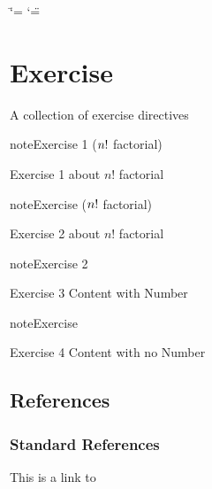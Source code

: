 

\ifdefined\shorthandoff
  \ifnum\catcode`\=\string=\active\shorthandoff{=}\fi
  \ifnum\catcode`\"=\active{}\fi
\fi

\pagestyle{empty}
\sphinxmaketitle
\pagestyle{plain}
\sphinxtableofcontents
\pagestyle{normal}
\label{\detokenize{index::doc}}


\sphinxstepscope


\chapter{Exercise}
\label{\detokenize{exercise:exercise}}\label{\detokenize{exercise::doc}}
\sphinxAtStartPar
A collection of exercise directives
 \label{exercise:exercise-1}

\begin{sphinxadmonition}{note}{Exercise 1 (\protect\(n!\protect\) factorial)}



\sphinxAtStartPar
Exercise 1 about \(n!\) factorial
\end{sphinxadmonition}
 \label{exercise:exercise-2}
\begin{sphinxadmonition}{note}{Exercise (\protect\(n!\protect\) factorial)}



\sphinxAtStartPar
Exercise 2 about \(n!\) factorial
\end{sphinxadmonition}
 \label{exercise:exercise-3}

\begin{sphinxadmonition}{note}{Exercise 2}



\sphinxAtStartPar
Exercise 3 Content with Number
\end{sphinxadmonition}
 \label{exercise:exercise-4}
\begin{sphinxadmonition}{note}{Exercise}



\sphinxAtStartPar
Exercise 4 Content with no Number
\end{sphinxadmonition}


\section{References}
\label{\detokenize{exercise:references}}

\subsection{Standard References}
\label{\detokenize{exercise:standard-references}}
\sphinxAtStartPar
This is a link to 

